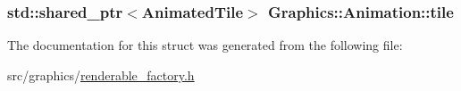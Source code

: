 \subsubsection[{tile}]{\setlength{\rightskip}{0pt plus 5cm}std\+::shared\+\_\+ptr$<${\bf Animated\+Tile}$>$ Graphics\+::\+Animation\+::tile}\label{struct_graphics_1_1_animation_ac0f14390b964e2be6cc008d7f12e8f70}


The documentation for this struct was generated from the following file\+:\begin{DoxyCompactItemize}
\item 
src/graphics/\hyperlink{renderable__factory_8h}{renderable\+\_\+factory.\+h}\end{DoxyCompactItemize}
